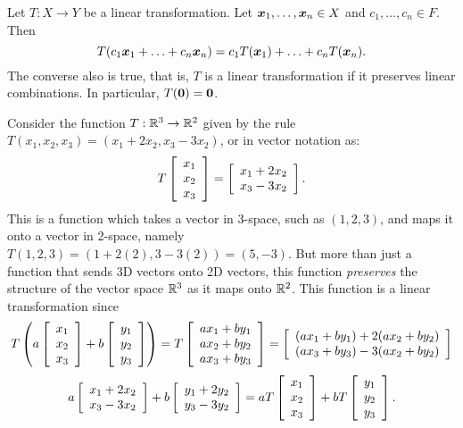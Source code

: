 \begin{Prop} Let $T : X\to Y$ be a linear transformation. Let $\boldsymbol x_1, \ldots, \boldsymbol x_n\in X$ and $c_1,\ldots, c_n\in F$. Then 
\[T(c_1\boldsymbol x_1 + \ldots + c_n\boldsymbol x_n) = c_1T(\boldsymbol x_1)+\ldots + c_nT(\boldsymbol x_n).\] The converse also is true, that is, $T$ is a linear transformation if it preserves linear combinations. In particular, $T(\boldsymbol 0) = \boldsymbol 0$.
\end{Prop}\vs

\begin{Exam}\label{exam:lintrans} Consider the function $T : \mathbb{R}^3 \to \mathbb{R}^2$ given by the rule $T(x_1, x_2, x_3) = (x_1+2x_2, x_3-3x_2)$, or in vector notation as:
\[T\left[\begin{array}{r} x_1\\x_2\\x_3 \end{array}\right] =  \left[\begin{array}{r} x_1+2x_2\\ x_3-3x_2 \end{array}\right].\] This is a function which takes a vector in 3-space, such as $(1,2,3)$, and maps it onto a vector in 2-space, namely $T(1,2,3)=(1+2(2), 3-3(2)) = (5,-3)$. But more than just a function that sends 3D vectors onto 2D vectors, this function \emph{preserves} the structure of the vector space $\mathbb{R}^3$ as it maps onto $\mathbb{R}^2$. This function is a linear transformation since 
\[T\left(a\left[\begin{array}{r} x_1\\x_2\\x_3 \end{array}\right] + b\left[\begin{array}{r} y_1\\y_2\\y_3 \end{array}\right]\right) = T\left[\begin{array}{r} ax_1+by_1\\ax_2+by_2\\ax_3+by_3 \end{array}\right] = \left[\begin{array}{r} (ax_1+by_1) +2(ax_2+by_2) \\ (ax_3+by_3)-3(ax_2+by_2) \end{array}\right]\]
\[ a\left[\begin{array}{r} x_1+2x_2 \\ x_3-3x_2 \end{array}\right] + b\left[\begin{array}{r} y_1+2y_2\\y_3-3y_2 \end{array}\right] = aT\left[\begin{array}{r} x_1\\x_2\\x_3 \end{array}\right] + bT\left[\begin{array}{r} y_1\\y_2\\y_3 \end{array}\right].\] 


\end{Exam}
